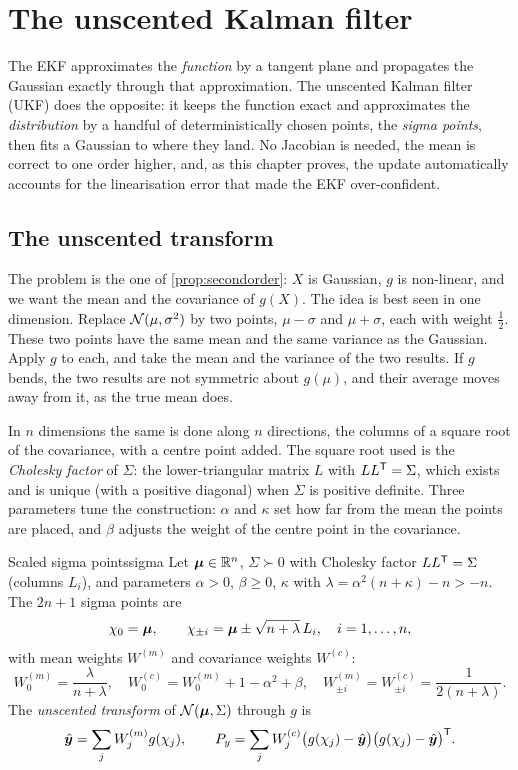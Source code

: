 \chapter{The unscented Kalman filter}
\label{ch:ukf}

The EKF approximates the \emph{function} by a tangent plane and propagates
the Gaussian exactly through that approximation. The unscented Kalman
filter (UKF) does the opposite: it keeps the function exact and
approximates the \emph{distribution} by a handful of deterministically
chosen points, the \emph{sigma points}, then fits a Gaussian to where they
land. No Jacobian is needed, the mean is correct to one order higher, and,
as this chapter proves, the update automatically accounts for the
linearisation error that made the EKF over-confident.

\section{The unscented transform}

The problem is the one of \cref{prop:secondorder}: $X$ is Gaussian, $g$ is
non-linear, and we want the mean and the covariance of $g(X)$. The idea is
best seen in one dimension. Replace $\mathcal{N}(\mu,\sigma^2)$ by two points,
$\mu-\sigma$ and $\mu+\sigma$, each with weight $\tfrac12$. These two
points have the same mean and the same variance as the Gaussian. Apply $g$
to each, and take the mean and the variance of the two results. If $g$
bends, the two results are not symmetric about $g(\mu)$, and their average
moves away from it, as the true mean does.

In $n$ dimensions the same is done along $n$ directions, the columns of a
square root of the covariance, with a centre point added. The square root
used is the \emph{Cholesky factor} of $\Sigma$: the lower-triangular
matrix $L$ with $LL^{\mathsf{T}}=\Sigma$, which exists and is unique (with a positive
diagonal) when $\Sigma$ is positive definite. Three parameters
tune the construction: $\alpha$ and $\kappa$ set how far from the mean the
points are placed, and $\beta$ adjusts the weight of the centre point in
the covariance.

\begin{definition}{Scaled sigma points}{sigma}
Let $\bm{\mu}\in\mathbb{R}^n$, $\Sigma\succ0$ with Cholesky factor $LL^{\mathsf{T}}=\Sigma$
(columns $L_i$), and parameters $\alpha>0$, $\beta\ge0$, $\kappa$ with
$\lambda=\alpha^2(n+\kappa)-n>-n$. The $2n+1$ sigma points are
\[
  \chi_0=\bm{\mu},\qquad\chi_{\pm i}=\bm{\mu}\pm\sqrt{n+\lambda}\,L_i,\quad
  i=1,\dots,n,
\]
with mean weights $W^{(m)}$ and covariance weights $W^{(c)}$:
\[
  W^{(m)}_0=\frac\lambda{n+\lambda},\quad
  W^{(c)}_0=W^{(m)}_0+1-\alpha^2+\beta,\quad
  W^{(m)}_{\pm i}=W^{(c)}_{\pm i}=\frac1{2(n+\lambda)}.
\]
The \emph{unscented transform} of $\mathcal{N}(\bm{\mu},\Sigma)$ through $g$ is
\[
  \hat{\bm{y}}=\sum_jW^{(m)}_jg(\chi_j),\qquad
  P_y=\sum_jW^{(c)}_j\bigl(g(\chi_j)-\hat{\bm{y}}\bigr)
  \bigl(g(\chi_j)-\hat{\bm{y}}\bigr)^{\mathsf{T}} .
\]
\end{definition}

